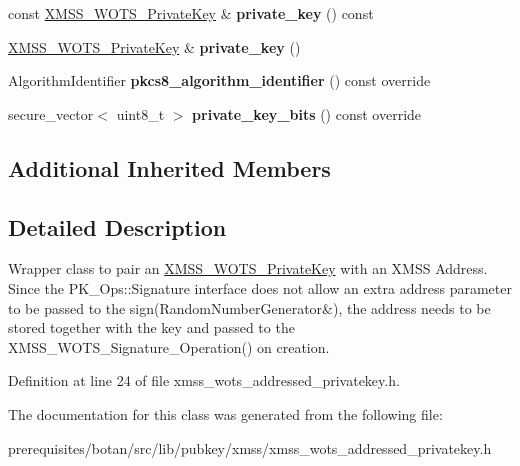 \begin{DoxyCompactItemize}
const \mbox{\hyperlink{class_botan_1_1_x_m_s_s___w_o_t_s___private_key}{X\+M\+S\+S\+\_\+\+W\+O\+T\+S\+\_\+\+Private\+Key}} \& {\bfseries private\+\_\+key} () const
\item 
\mbox{\label{class_botan_1_1_x_m_s_s___w_o_t_s___addressed___private_key_ac231fbcc41e0d3634cf1697b6cf4e9c9}} 
\mbox{\hyperlink{class_botan_1_1_x_m_s_s___w_o_t_s___private_key}{X\+M\+S\+S\+\_\+\+W\+O\+T\+S\+\_\+\+Private\+Key}} \& {\bfseries private\+\_\+key} ()
\item 
\mbox{\label{class_botan_1_1_x_m_s_s___w_o_t_s___addressed___private_key_a5337efdd1d14c4298c0e1fd4aa013afe}} 
Algorithm\+Identifier {\bfseries pkcs8\+\_\+algorithm\+\_\+identifier} () const override
\item 
\mbox{\label{class_botan_1_1_x_m_s_s___w_o_t_s___addressed___private_key_a824d677a3601ef335104eb215d62577c}} 
secure\+\_\+vector$<$ uint8\+\_\+t $>$ {\bfseries private\+\_\+key\+\_\+bits} () const override
\end{DoxyCompactItemize}
\subsection*{Additional Inherited Members}


\subsection{Detailed Description}
Wrapper class to pair an \mbox{\hyperlink{class_botan_1_1_x_m_s_s___w_o_t_s___private_key}{X\+M\+S\+S\+\_\+\+W\+O\+T\+S\+\_\+\+Private\+Key}} with an X\+M\+SS Address. Since the P\+K\+\_\+\+Ops\+::\+Signature interface does not allow an extra address parameter to be passed to the sign(\+Random\+Number\+Generator\&), the address needs to be stored together with the key and passed to the X\+M\+S\+S\+\_\+\+W\+O\+T\+S\+\_\+\+Signature\+\_\+\+Operation() on creation. 

Definition at line 24 of file xmss\+\_\+wots\+\_\+addressed\+\_\+privatekey.\+h.



The documentation for this class was generated from the following file\+:\begin{DoxyCompactItemize}
\item 
prerequisites/botan/src/lib/pubkey/xmss/xmss\+\_\+wots\+\_\+addressed\+\_\+privatekey.\+h\end{DoxyCompactItemize}
